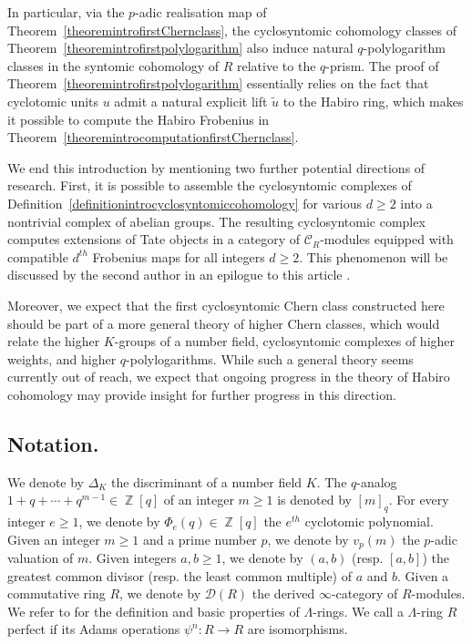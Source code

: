 \documentclass[10pt,twoside]{scrarticle}
\theoremstyle{definition}
\DeclareMathOperator{\Z}{\mathbb{Z}}
\newcommand{\CR}{\mathcal{C}_{R}}
\renewcommand{\ge}{\geqslant}
\numberwithin{equation}{theorem}
\begin{document}
    In particular, via the $p$-adic realisation map of Theorem~\ref{theoremintrofirstChernclass}, the cyclosyntomic cohomology classes of Theorem~\ref{theoremintrofirstpolylogarithm} also induce natural $q$-polylogarithm classes in the syntomic cohomology of $R$ relative to the $q$-prism. The proof of Theorem~\ref{theoremintrofirstpolylogarithm} essentially relies on the fact that cyclotomic units $u$ admit a natural explicit lift $\tilde{u}$ to the Habiro ring, which makes it possible to compute the Habiro Frobenius in Theorem~\ref{theoremintrocomputationfirstChernclass}.

    We end this introduction by mentioning two further potential directions of research. First, it is possible to assemble the cyclosyntomic complexes of Definition~\ref{definitionintrocyclosyntomiccohomology} for various $d \ge 2$ into a nontrivial complex of abelian groups. The resulting cyclosyntomic complex computes extensions of Tate objects in a category of $\CR$-modules equipped with compatible $d^{th}$ Frobenius maps for all integers $d \ge 2$. This phenomenon will be discussed by the second author in an epilogue to this article \cite{gazda-epilog}.
    
    Moreover, we expect that the first cyclosyntomic Chern class constructed here should be part of a more general theory of higher Chern classes, which would relate the higher $K$-groups of a number field, cyclosyntomic complexes of higher weights, and higher $q$-polylogarithms. While such a general theory seems currently out of reach, we expect that ongoing progress in the theory of Habiro cohomology may provide insight for further progress in this direction.
     
 
\subsection*{Notation.}

We denote by $\Delta_K$ the discriminant of a number field $K$. 
The $q$-analog $1+q+\cdots+q^{m-1} \in \Z[q]$ of an integer $m \ge 1$ is denoted by $[m]_q$.
For every integer $e \ge 1$, we denote by $\Phi_e(q) \in \Z[q]$ the $e^{th}$ cyclotomic polynomial. 
Given an integer $m \ge 1$ and a prime number $p$, we denote by $v_p(m)$ the $p$-adic valuation of $m$.
Given integers $a,b \ge 1$, we denote by $(a,b)$ (resp. $[a,b]$) the greatest common divisor (resp. the least common multiple) of $a$ and $b$.  
Given a commutative ring $R$, we denote by $\mathcal{D}(R)$ the derived $\infty$-category of $R$-modules.
We refer to \cite[Sections~I.1 and I.4]{atiyah_group_1969} for the definition and basic properties of $\Lambda$-rings. We call a $\Lambda$-ring $R$ perfect if its Adams operations $\psi^n : R \rightarrow R$ are isomorphisms. 
\end{document}
